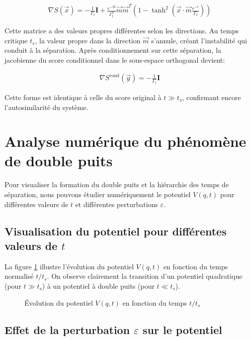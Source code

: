 \documentclass[11pt,a4paper]{article}
\begin{document}
\begin{align}
\nabla S(\vec{x}) = -\frac{1}{\Gamma_t}\mathbf{I} + \frac{e^{-2t}}{\Gamma_t^2}\vec{m}\vec{m}^T\left(1 - \tanh^2\left(\vec{x}\cdot\vec{m}\frac{e^{-t}}{\Gamma_t}\right)\right)
\end{align}

Cette matrice a des valeurs propres différentes selon les directions. Au temps critique $t_s$, la valeur propre dans la direction $\vec{m}$ s'annule, créant l'instabilité qui conduit à la séparation. Après conditionnement sur cette séparation, la jacobienne du score conditionnel dans le sous-espace orthogonal devient:

\begin{align}
\nabla S^{\text{cond}}(\vec{y}) = -\frac{1}{\Gamma_t}\mathbf{I}
\end{align}

Cette forme est identique à celle du score original à $t \gg t_s$, confirmant encore l'autosimilarité du système.

\section{Analyse numérique du phénomène de double puits}

Pour visualiser la formation du double puits et la hiérarchie des temps de séparation, nous pouvons étudier numériquement le potentiel $V(q,t)$ pour différentes valeurs de $t$ et différentes perturbations $\varepsilon$.

\subsection{Visualisation du potentiel pour différentes valeurs de $t$}

La figure \ref{fig:potential_evolution} illustre l'évolution du potentiel $V(q,t)$ en fonction du temps normalisé $t/t_s$. On observe clairement la transition d'un potentiel quadratique (pour $t \gg t_s$) à un potentiel à double puits (pour $t \ll t_s$).

\begin{figure}[h]
    \centering
    \caption{Évolution du potentiel $V(q,t)$ en fonction du temps $t/t_s$}
    \label{fig:potential_evolution}
\end{figure}

\subsection{Effet de la perturbation $\varepsilon$ sur le potentiel}
\end{document}
